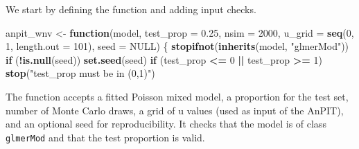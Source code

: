 \documentclass[
  letterpaper,
]{krantz}
\newenvironment{Shaded}{\begin{snugshade}}{\end{snugshade}}
\newcommand{\AttributeTok}[1]{\textcolor[rgb]{0.13,0.29,0.53}{#1}}
\newcommand{\ConstantTok}[1]{\textcolor[rgb]{0.56,0.35,0.01}{#1}}
\newcommand{\ControlFlowTok}[1]{\textcolor[rgb]{0.13,0.29,0.53}{\textbf{#1}}}
\newcommand{\DecValTok}[1]{\textcolor[rgb]{0.00,0.00,0.81}{#1}}
\newcommand{\FloatTok}[1]{\textcolor[rgb]{0.00,0.00,0.81}{#1}}
\newcommand{\FunctionTok}[1]{\textcolor[rgb]{0.13,0.29,0.53}{\textbf{#1}}}
\newcommand{\NormalTok}[1]{#1}
\newcommand{\OtherTok}[1]{\textcolor[rgb]{0.56,0.35,0.01}{#1}}
\newcommand{\SpecialCharTok}[1]{\textcolor[rgb]{0.81,0.36,0.00}{\textbf{#1}}}
\newcommand{\StringTok}[1]{\textcolor[rgb]{0.31,0.60,0.02}{#1}}
\begin{document}
We start by defining the function and adding input checks.

\begin{Shaded}
\begin{Highlighting}[]
\NormalTok{anpit\_wnv }\OtherTok{\textless{}{-}} \ControlFlowTok{function}\NormalTok{(model, }\AttributeTok{test\_prop =} \FloatTok{0.25}\NormalTok{, }\AttributeTok{nsim =} \DecValTok{2000}\NormalTok{,}
                      \AttributeTok{u\_grid =} \FunctionTok{seq}\NormalTok{(}\DecValTok{0}\NormalTok{, }\DecValTok{1}\NormalTok{, }\AttributeTok{length.out =} \DecValTok{101}\NormalTok{), }\AttributeTok{seed =} \ConstantTok{NULL}\NormalTok{) \{}
  \FunctionTok{stopifnot}\NormalTok{(}\FunctionTok{inherits}\NormalTok{(model, }\StringTok{"glmerMod"}\NormalTok{))}
  \ControlFlowTok{if}\NormalTok{ (}\SpecialCharTok{!}\FunctionTok{is.null}\NormalTok{(seed)) }\FunctionTok{set.seed}\NormalTok{(seed)}
  \ControlFlowTok{if}\NormalTok{ (test\_prop }\SpecialCharTok{\textless{}=} \DecValTok{0} \SpecialCharTok{||}\NormalTok{ test\_prop }\SpecialCharTok{\textgreater{}=} \DecValTok{1}\NormalTok{) }\FunctionTok{stop}\NormalTok{(}\StringTok{"test\_prop must be in (0,1)"}\NormalTok{)}
\end{Highlighting}
\end{Shaded}

The function accepts a fitted Poisson mixed model, a proportion for the
test set, number of Monte Carlo draws, a grid of u values (used as input
of the AnPIT), and an optional seed for reproducibility. It checks that
the model is of class \texttt{glmerMod} and that the test proportion is
valid.

\begin{Shaded}
\end{Shaded}
\end{document}

